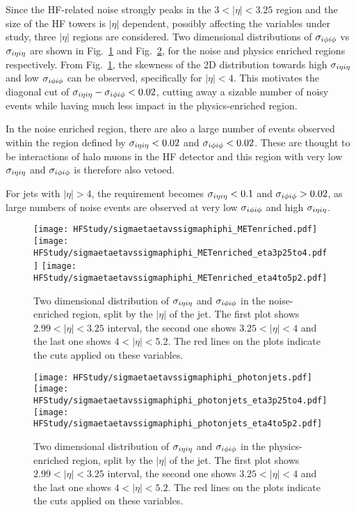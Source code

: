 Since the HF-related noise strongly peaks in the $3<|\eta|<3.25$ region and the size of the HF towers is $|\eta|$ dependent, 
possibly affecting the variables under study, three $|\eta|$ regions are considered. 
Two dimensional distributions of $\sigma_{i\phi i\phi}$ vs  $\sigma_{i\eta i\eta}$ are shown in Fig.~\ref{fig:sieie_sipip_noise_enriched} and Fig.~\ref{fig:sieie_sipip_physics_enriched},
for the noise and physics enriched regions respectively. 
From Fig.~\ref{fig:sieie_sipip_noise_enriched}, the skewness of the 2D distribution towards high $\sigma_{i\eta i\eta}$ and low $\sigma_{i\phi i\phi}$
can be observed, specifically for $|\eta| < 4$. This motivates the diagonal cut of $\sigma_{i\eta i\eta} - \sigma_{i\phi i\phi} < 0.02$, cutting away a sizable number of noisy events while
having much less impact in the physics-enriched region. 

In the noise enriched region, there are also a large number of events observed within the region defined by $\sigma_{i\eta i\eta} < 0.02$ and $\sigma_{i\phi i\phi} < 0.02$. 
These are thought to be interactions of halo muons in the HF detector and this region with very low $\sigma_{i\eta i\eta}$ and $\sigma_{i\phi i\phi}$ is therefore also vetoed. 

For jets with $|\eta| > 4$, the requirement becomes $\sigma_{i\eta i\eta} < 0.1$ and $\sigma_{i\phi i\phi} > 0.02$, as large numbers of noise events are observed at very low
$\sigma_{i\phi i\phi}$ and high $\sigma_{i\eta i\eta}$.

\begin{figure}
    \centering
    \texttt{[image: HFStudy/sigmaetaetavssigmaphiphi\_METenriched.pdf]}
    \texttt{[image: HFStudy/sigmaetaetavssigmaphiphi\_METenriched\_eta3p25to4.pdf]}
    \texttt{[image: HFStudy/sigmaetaetavssigmaphiphi\_METenriched\_eta4to5p2.pdf]}
    \caption{Two dimensional distribution of $\sigma_{i\eta i\eta}$ and $\sigma_{i\phi i\phi}$ in the noise-enriched region, split by the $|\eta|$ of the jet. The first plot shows 
    $2.99 < |\eta| < 3.25$ interval, the second one shows $3.25 < |\eta| < 4$ and the last one shows $4 < |\eta| < 5.2$. The red lines on the plots indicate
    the cuts applied on these variables.}
    \label{fig:sieie_sipip_noise_enriched}
\end{figure}

\begin{figure}
    \centering
    \texttt{[image: HFStudy/sigmaetaetavssigmaphiphi\_photonjets.pdf]}
    \texttt{[image: HFStudy/sigmaetaetavssigmaphiphi\_photonjets\_eta3p25to4.pdf]}
    \texttt{[image: HFStudy/sigmaetaetavssigmaphiphi\_photonjets\_eta4to5p2.pdf]}
    \caption{Two dimensional distribution of $\sigma_{i\eta i\eta}$ and $\sigma_{i\phi i\phi}$ in the physics-enriched region, split by the $|\eta|$ of the jet. The first plot shows 
    $2.99 < |\eta| < 3.25$ interval, the second one shows $3.25 < |\eta| < 4$ and the last one shows $4 < |\eta| < 5.2$. The red lines on the plots indicate
    the cuts applied on these variables.}
    \label{fig:sieie_sipip_physics_enriched}
\end{figure}

